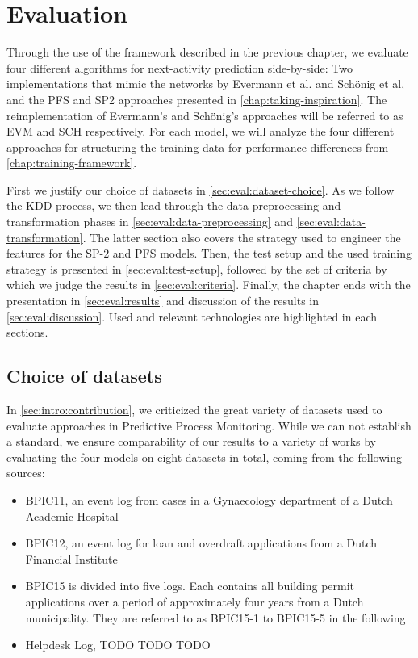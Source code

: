 \chapter{Evaluation}\label{chap:evaluation}
Through the use of the framework described in the previous chapter, we evaluate four different algorithms for next-activity prediction side-by-side: Two implementations that mimic the networks by Evermann et al. and Schönig et al, and the PFS and SP2 approaches presented in \autoref{chap:taking-inspiration}. The reimplementation of Evermann's and Schönig's approaches will be referred to as EVM and SCH respectively. For each model, we will analyze the four different approaches for structuring the training data for performance differences from \autoref{chap:training-framework}.

First we justify our choice of datasets in \autoref{sec:eval:dataset-choice}. As we follow the KDD process, we then lead through the data preprocessing and transformation phases in \autoref{sec:eval:data-preprocessing} and \autoref{sec:eval:data-transformation}. The latter section also covers the strategy used to engineer the features for the SP-2 and PFS models.
Then, the test setup and the used training strategy is presented in \autoref{sec:eval:test-setup}, followed by the set of criteria by which we judge the results in \autoref{sec:eval:criteria}. Finally, the chapter ends with the presentation in \autoref{sec:eval:results} and discussion of the results in \autoref{sec:eval:discussion}. Used and relevant technologies are highlighted in each sections.

\section{Choice of datasets}
\label{sec:eval:dataset-choice}
In \autoref{sec:intro:contribution}, we criticized the great variety of datasets used to evaluate approaches in Predictive Process Monitoring. While we can not establish a standard, we ensure comparability of our results to a variety of works by evaluating the four models on eight datasets in total, coming from the following sources:

\begin{itemize}
    \item BPIC11, an event log from cases in a Gynaecology department of a Dutch Academic Hospital~\cite{BPIC2011}
    \item BPIC12, an event log for loan and overdraft applications from a Dutch Financial Institute~\cite{BPIC2012}
    \item BPIC15 is divided into five logs. Each contains all building permit applications over a period of approximately four years from a Dutch municipality. They are referred to as BPIC15-1 to BPIC15-5 in the following~\cite{BPIC2015}
    \item Helpdesk Log, TODO TODO TODO
\end{itemize}


